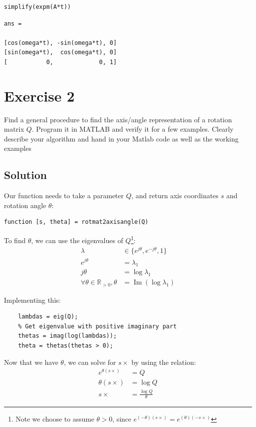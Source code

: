 \documentclass[11pt]{article}
\begin{document}
\begin{verbatim}
simplify(expm(A*t))
\end{verbatim}

\begin{verbatim}
ans =
 
[cos(omega*t), -sin(omega*t), 0]
[sin(omega*t),  cos(omega*t), 0]
[           0,             0, 1]
\end{verbatim}

\section{Exercise 2}
\label{sec:org1eb8e14}
Find a general procedure to find the axis/angle representation of a rotation matrix \(Q\).
Program it in MATLAB and verify it for a few examples.
Clearly describe your algorithm and hand in your Matlab code as well as the working examples

\subsection{Solution}
\label{sec:org0a711f9}
Our function needs to take a parameter \(Q\), and return axis coordinates \(s\) and rotation angle \(\theta\):
\begin{verbatim}
function [s, theta] = rotmat2axisangle(Q)
\end{verbatim}

To find \(\theta\), we can use the eigenvalues of \(Q\)\footnote{Note we choose to assume \(\theta > 0\), since \(e^{(-\theta)(s\times)} = e^{(\theta)(-s\times)}\)}:
\begin{align*}
\lambda
&\in
\{
  e^{j\theta},
  e^{-j\theta},
  1
\} \\
e^{j\theta} &= \lambda_1 \\
j\theta &= \log\lambda_1 \\
\forall \theta \in \mathbb{R}_{>0}, \theta &= \operatorname{Im}(\log\lambda_1)
\end{align*}

Implementing this:
\begin{verbatim}
    lambdas = eig(Q);
    % Get eigenvalue with positive imaginary part
    thetas = imag(log(lambdas));
    theta = thetas(thetas > 0);
\end{verbatim}

Now that we have \(\theta\), we can solve for \(s\times\) by using the relation:
\begin{align*}
e^{\theta(s\times)}
&= 
Q \\
\theta(s\times)
&=
\log{Q} \\
s\times
&=
\frac{\log{Q}}{\theta}
\end{align*}
\end{document}
